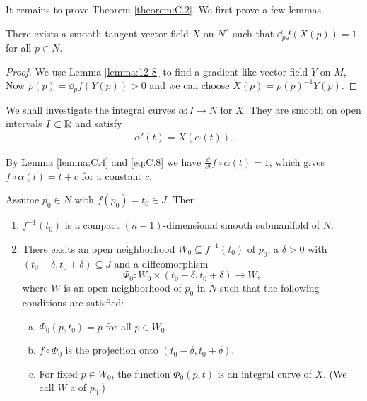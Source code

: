 It remains to prove Theorem \ref{theorem:C.2}. We first prove a few lemmas.

\begin{lemma}\label{lemma:C.4}
  There exists a smooth tangent vector field $X$ on $N^n$ such that $\dd_p f(X(p))=1$ for all $p\in N$.
\end{lemma}

\begin{proof}
  We use Lemma \ref{lemma:12-8} to find a gradient-like vector field $Y$ on $M$, Now $\rho(p) = \dd_pf(Y(p))>0$
  and we can choose $X(p)=\rho(p)^{-1}Y(p)$.
\end{proof}

We shall investigate the integral curves $\alpha:I\to N$ for $X$. They are smooth on
open intervals $I\subset{\ensuremath{\mathbb{R}}}$ and satisfy
\begin{align}\label{eq:C.8}
  \alpha'(t) = X(\alpha(t)).
\end{align}

By Lemma \ref{lemma:C.4} and \eqref{eq:C.8} we have $\frac{\dd }{\dd t}f\circ \alpha(t) = 1$, which gives 
$f\circ \alpha(t) = t+c$ for a constant $c$.

\begin{lemma}\label{lemma:C.5}
  Assume $p_0\in N$ with $f(p_0)=t_0\in J$. Then 
  \begin{enumerate}
    \item $f^{-1}(t_0)$ is a compact $(n-1)$-dimensional smooth submanifold of $N$.
    \item There exsits an open neighborhood $W_0\subseteq f^{-1}(t_0)$ of $p_0$, a $\delta >0$ with 
      $(t_0-\delta, t_0+\delta)\subseteq J$ and a diffeomorphism
      \[
        \Phi_0:W_0\times (t_0-\delta, t_0+\delta)\to W,
      \]
      where $W$ is an open neighborhood of $p_0$ in $N$ such that the following conditions are satisfied:
      \begin{enumerate}[(a)]
        \item $\Phi_0(p, t_0)=p$ for all $p\in W_0$.
        \item $f\circ\Phi_0$ is the projection onto $(t_0-\delta, t_0+\delta)$.
        \item For fixed $p\in W_0$, the function $\Phi_0(p, t)$ is an integral curve of $X$. 
          (We call $W$ a  of $p_0$.) 
      \end{enumerate}
  \end{enumerate}
\end{lemma}

